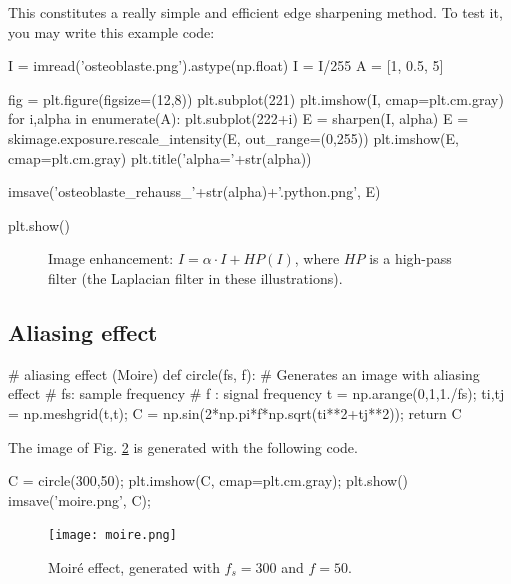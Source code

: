 This constitutes a really simple and efficient edge sharpening method. To test it, you may write this example code:
\begin{python}
I = imread('osteoblaste.png').astype(np.float)
I = I/255
A = [1, 0.5, 5]

fig = plt.figure(figsize=(12,8))
plt.subplot(221)
plt.imshow(I, cmap=plt.cm.gray)
for i,alpha in enumerate(A):
    plt.subplot(222+i)
    E = sharpen(I, alpha)
    E = skimage.exposure.rescale_intensity(E, out_range=(0,255))
    plt.imshow(E, cmap=plt.cm.gray)
    plt.title('alpha='+str(alpha))
    
    imsave('osteoblaste_rehauss_'+str(alpha)+'.python.png', E)

plt.show()
\end{python}


\begin{figure}[htbp]
 \centering
 
 \hspace{1cm}
 
 \hspace{1cm}

 \caption{Image enhancement: $I=\alpha\cdot I+HP(I)$, where $HP$ is a high-pass filter (the Laplacian filter in these illustrations).}
 \label{fig:introduction:matlab:enhancement}
\end{figure}



\subsection{Aliasing effect}
\begin{python}
# aliasing effect (Moire)
def circle(fs, f):
    # Generates an image with aliasing effect
    # fs: sample frequency
    # f : signal frequency
    t = np.arange(0,1,1./fs);
    ti,tj = np.meshgrid(t,t);
    C = np.sin(2*np.pi*f*np.sqrt(ti**2+tj**2));
    return C
\end{python}

The image of Fig. \ref{fig:introduction:python:aliasing} is generated with the following code.

\begin{python}
C = circle(300,50);
plt.imshow(C, cmap=plt.cm.gray);
plt.show()
imsave('moire.png', C);
\end{python}

\begin{figure}[H]
 \centering\caption{Moiré effect, generated with $f_s=300$ and $f=50$.}%
 \vspace*{-2pt}%
 \texttt{[image: moire.png]}%
 \vspace*{-10pt}%
 \label{fig:introduction:python:aliasing}%
\end{figure}

